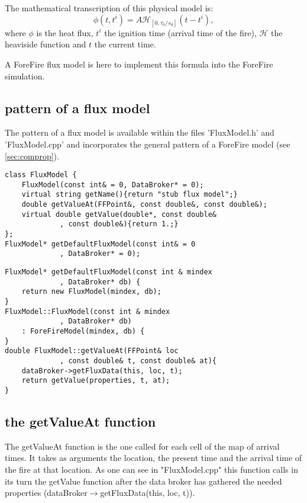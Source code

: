 The mathematical transcription of this physical model is: \begin{equation} \phi(t,t^{i}) = A\mathcal{H}_{[0,\tau_{0}/s_{d}]}(t-t^{i}), \label{eq:hfb}\end{equation} where $\phi$ is the heat flux, $t^{i}$ the ignition time (arrival time of the fire), $\mathcal{H}$ the heaviside function and $t$ the current time.

A ForeFire flux model is here to implement this formula into the ForeFire simulation.

\subsection*{pattern of a flux model}

The pattern of a flux model is available within the files 'FluxModel.h' and 'FluxModel.cpp' and incorporates the general pattern of a ForeFire model (see \ref{sec:comprop}).

\begin{lstlisting}[caption={FluxModel.h},frame=single]
class FluxModel {
	FluxModel(const int& = 0, DataBroker* = 0);
	virtual string getName(){return "stub flux model";}
	double getValueAt(FFPoint&, const double&, const double&);
	virtual double getValue(double*, const double&
             , const double&){return 1.;}
};
FluxModel* getDefaultFluxModel(const int& = 0
             , DataBroker* = 0);
\end{lstlisting}

\begin{lstlisting}[caption={FluxModel.cpp},frame=single]
FluxModel* getDefaultFluxModel(const int & mindex
             , DataBroker* db) {
	return new FluxModel(mindex, db);
}
FluxModel::FluxModel(const int & mindex
             , DataBroker* db)
	: ForeFireModel(mindex, db) {
}
double FluxModel::getValueAt(FFPoint& loc
             , const double& t, const double& at){
	dataBroker->getFluxData(this, loc, t);
	return getValue(properties, t, at);
}
\end{lstlisting}

\subsection*{the getValueAt function}

The getValueAt function is the one called for each cell of the map of arrival times. It takes as arguments the location, the present time and the arrival time of the fire at that location. As one can see in "FluxModel.cpp" this function calls in its turn the getValue function after the data broker has gathered the needed properties (dataBroker$\rightarrow$getFluxData(this, loc, t)).

